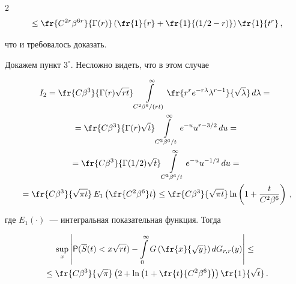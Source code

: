 \begin{multicols}{2}
\begin{multline*}
{}\le


\fr{C^{2r}\beta^{6r}}{\Gamma(r)}\left(\fr{1}{r}+\fr{1}{(1/2-r)}\right)\fr{1}{t^r}\,,


\end{multline*}


что и требовалось доказать.








Докажем пункт $3^{\circ}$. Несложно видеть, что в этом случае


\begin{multline*}


I_2=\fr{C\beta^3}{\Gamma(r)\sqrt{ r


t}}\int\limits_{C^2\beta^6/(rt)}^{\infty}\fr{r^r


e^{-r\lambda}\lambda^{r-1} }{\sqrt{\lambda}}\,d\lambda


={}\\


{}=\fr{C\beta^3}{\Gamma(r)\sqrt{t}}\int\limits_{C^2\beta^6/t}^{\infty}e^{-u}u^{r-3/2}\,du={}


\\{}


=\fr{C\beta^3}{\Gamma(1/2)\sqrt{t}}\int\limits_{C^2\beta^6/t}^{\infty}e^{-u}u^{-1/2}\,du={}\\


{}=


\fr{C\beta^3}{\sqrt{\pi t}}\,E_1\left(\fr{C^2\beta^6}t\right)\le


\fr{C\beta^3}{\sqrt{\pi t}}\ln\left(1+\frac{t}{C^2\beta^6}\right)\,,


\end{multline*}


где $E_1(\cdot)$~--- интегральная показательная функция. Тогда


\begin{multline*}


\sup\limits_x\left\vert{\sf P}(\overline


S(t)<x\sqrt{rt})-\int\limits_{0}^{\infty}


G\left(\fr{x}{\sqrt{y}}\right)dG_{r,r}(y)\right\vert 


\le{}\\


{}\le


\fr{C\beta^3}{\sqrt{\pi}}\left(2+\ln\left(1+\fr{t}{C^2\beta^6}\right)\right)


\fr{1}{\sqrt{t}}\,.


\end{multline*}



\end{multicols}
